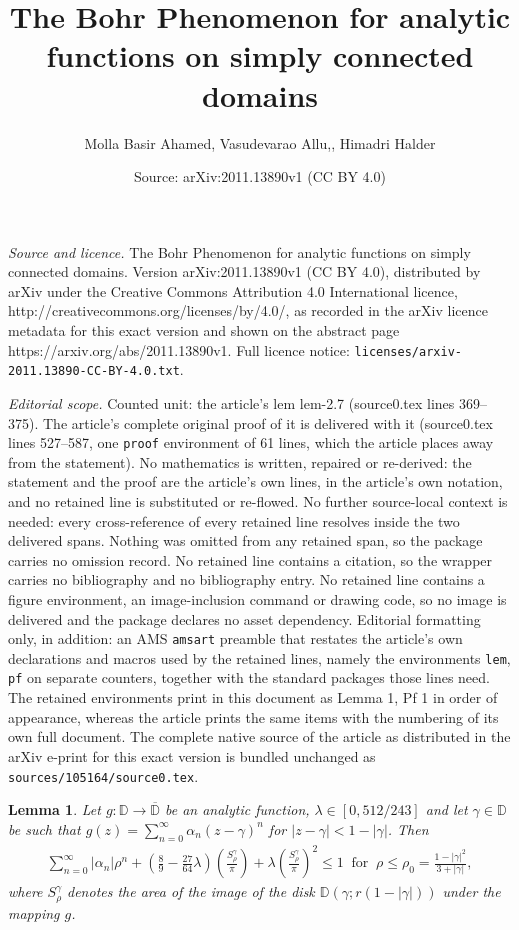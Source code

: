 \documentclass[10pt,a4paper]{amsart}
\title{The Bohr Phenomenon for analytic functions on simply connected domains}
\author{Molla Basir Ahamed, Vasudevarao Allu,, Himadri Halder}
\date{Source: arXiv:2011.13890v1 (CC BY 4.0)}
\newtheorem{lem}{Lemma}
\begin{document}
\maketitle

\noindent\emph{Source and licence.} The Bohr Phenomenon for analytic functions on simply connected domains. Version arXiv:2011.13890v1 (CC BY 4.0), distributed by arXiv under the Creative Commons Attribution 4.0 International licence, http://creativecommons.org/licenses/by/4.0/, as recorded in the arXiv licence metadata for this exact version and shown on the abstract page https://arxiv.org/abs/2011.13890v1. Full licence notice: \texttt{licenses/arxiv-2011.13890-CC-BY-4.0.txt}.\par\smallskip

\noindent\textit{Editorial scope.} Counted unit: the article's lem lem-2.7 (source0.tex lines 369--375). The article's complete original proof of it is delivered with it (source0.tex lines 527--587, one \texttt{proof} environment of 61 lines, which the article places away from the statement). No mathematics is written, repaired or re-derived: the statement and the proof are the article's own lines, in the article's own notation, and no retained line is substituted or re-flowed.  No further source-local context is needed: every cross-reference of every retained line resolves inside the two delivered spans.  Nothing was omitted from any retained span, so the package carries no omission record.  No retained line contains a citation, so the wrapper carries no bibliography and no bibliography entry.  No retained line contains a figure environment, an image-inclusion command or drawing code, so no image is delivered and the package declares no asset dependency.  Editorial formatting only, in addition: an AMS \texttt{amsart} preamble that restates the article's own declarations and macros used by the retained lines, namely the environments \texttt{lem}, \texttt{pf} on separate counters, together with the standard packages those lines need.  The retained environments print in this document as Lemma 1, Pf 1 in order of appearance, whereas the article prints the same items with the numbering of its own full document.  The complete native source of the article as distributed in the arXiv e-print for this exact version is bundled unchanged as \texttt{sources/105164/source0.tex}.
\begin{lem}\label{lem-2.7}
	Let $ g : \mathbb{D}\rightarrow\overline{\mathbb{D}} $ be an analytic function, $ \lambda\in [0,512/243] $ and let $ \gamma\in\mathbb{D} $ be such that $ g(z)=\sum_{n=0}^{\infty}\alpha_n(z-\gamma)^n $ for $ |z-\gamma|<1-|\gamma| $. Then 
	\begin{align*}
		\sum_{n=0}^{\infty}|\alpha_n|\rho^n+\left(\frac{8}{9}-\frac{27}{64}\lambda\right)\left(\frac{S^{\gamma}_{\rho}}{\pi}\right)+\lambda\left(\frac{S^{\gamma}_{\rho}}{\pi}\right)^2\leq 1\;\; \text{for}\;\; \rho\leq \rho_0=\frac{1-|\gamma|^2}{3+|\gamma|},
	\end{align*}
	where $ S^{\gamma}_{\rho} $ denotes the area of the image of the disk $ \mathbb{D}(\gamma;r(1-|\gamma|)) $ under the mapping  $ g $.
\end{lem}
\end{document}
